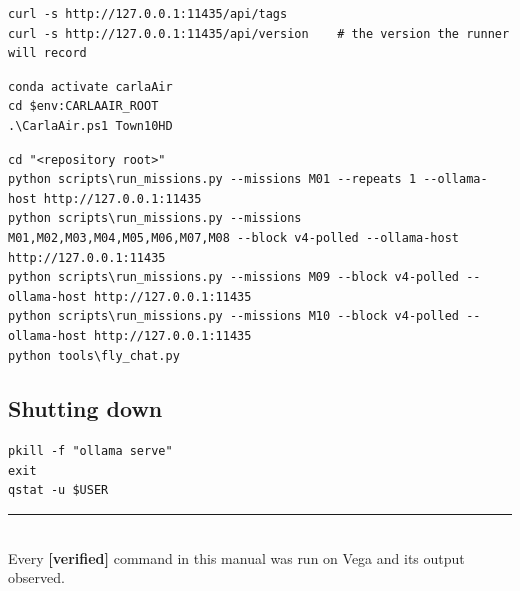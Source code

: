 \documentclass[11pt,a4paper]{article}
\newcommand{\verified}{{\color{good}\textbf{[verified]}}}
\begin{document}
\begin{lstlisting}
curl -s http://127.0.0.1:11435/api/tags
curl -s http://127.0.0.1:11435/api/version    # the version the runner will record
\end{lstlisting}

\begin{lstlisting}
conda activate carlaAir
cd $env:CARLAAIR_ROOT
.\CarlaAir.ps1 Town10HD
\end{lstlisting}

\begin{lstlisting}
cd "<repository root>"
python scripts\run_missions.py --missions M01 --repeats 1 --ollama-host http://127.0.0.1:11435
python scripts\run_missions.py --missions M01,M02,M03,M04,M05,M06,M07,M08 --block v4-polled --ollama-host http://127.0.0.1:11435
python scripts\run_missions.py --missions M09 --block v4-polled --ollama-host http://127.0.0.1:11435
python scripts\run_missions.py --missions M10 --block v4-polled --ollama-host http://127.0.0.1:11435
python tools\fly_chat.py
\end{lstlisting}

\subsection{Shutting down}
\begin{lstlisting}
pkill -f "ollama serve"
exit
qstat -u $USER
\end{lstlisting}

\vfill
\begin{center}
\small\color{accent}\rule{0.35\linewidth}{0.4pt}\\[4pt]
Every \verified{} command in this manual was run on Vega and its output observed.
\end{center}
\end{document}

